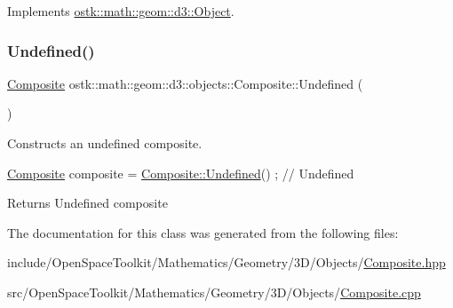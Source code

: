 Implements \hyperlink{classostk_1_1math_1_1geom_1_1d3_1_1_object_ab2a2a782503b97d1cecabdfedc636fce}{ostk\+::math\+::geom\+::d3\+::\+Object}.

\mbox{\label{classostk_1_1math_1_1geom_1_1d3_1_1objects_1_1_composite_abd7585518f349e7d599a81102f9e0e41}} 
\subsubsection{\texorpdfstring{Undefined()}{Undefined()}}
{\footnotesize\ttfamily \hyperlink{classostk_1_1math_1_1geom_1_1d3_1_1objects_1_1_composite}{Composite} ostk\+::math\+::geom\+::d3\+::objects\+::\+Composite\+::\+Undefined (\begin{DoxyParamCaption}{ }\end{DoxyParamCaption})\hspace{0.3cm}{\ttfamily [static]}}



Constructs an undefined composite. 


\begin{DoxyCode}
\hyperlink{classostk_1_1math_1_1geom_1_1d3_1_1objects_1_1_composite_aaecda2f184484d63a52de87706a37d4c}{Composite} composite = \hyperlink{classostk_1_1math_1_1geom_1_1d3_1_1objects_1_1_composite_abd7585518f349e7d599a81102f9e0e41}{Composite::Undefined}() ; \textcolor{comment}{// Undefined}
\end{DoxyCode}


\begin{DoxyReturn}{Returns}
Undefined composite 
\end{DoxyReturn}


The documentation for this class was generated from the following files\+:\begin{DoxyCompactItemize}
\item 
include/\+Open\+Space\+Toolkit/\+Mathematics/\+Geometry/3\+D/\+Objects/\hyperlink{_composite_8hpp}{Composite.\+hpp}\item 
src/\+Open\+Space\+Toolkit/\+Mathematics/\+Geometry/3\+D/\+Objects/\hyperlink{_composite_8cpp}{Composite.\+cpp}\end{DoxyCompactItemize}
